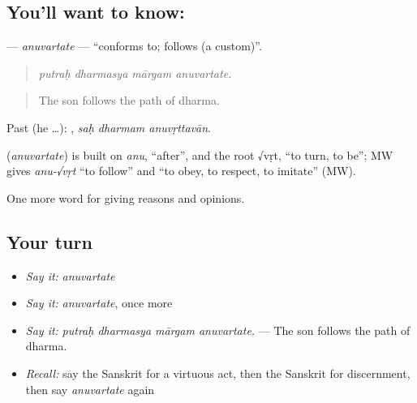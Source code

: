 \subsection*{You'll want to know: }
\textbf{} — \emph{anuvartate} — \textquotedblleft{}conforms to; follows (a custom)\textquotedblright{}.

\begin{quote}
   
\end{quote}

\begin{quote}
\emph{putraḥ dharmasya mārgam anuvartate.}
\end{quote}

\begin{quote}
The son follows the path of dharma.
\end{quote}

Past (he …):   , \emph{saḥ dharmam anuvṛttavān}.

\begin{cousinweb}
\textbf{} (\emph{anuvartate}) is built on \emph{anu}, \textquotedblleft{}after\textquotedblright{}, and the root √vṛt, \textquotedblleft{}to turn, to be\textquotedblright{}; MW gives \emph{anu-√vṛt} \textquotedblleft{}to follow\textquotedblright{} and \textquotedblleft{}to obey, to respect, to imitate\textquotedblright{} (MW).
\end{cousinweb}

\begin{grammarlens}[title={What you've built}]
One more word for giving reasons and opinions.
\end{grammarlens}

\subsection*{Your turn}
\begin{itemize}
\raggedright
  \item \emph{Say it:} \emph{anuvartate}
  \item \emph{Say it:} \emph{anuvartate}, once more
  \item \emph{Say it:} \emph{putraḥ dharmasya mārgam anuvartate.} — The son follows the path of dharma.
  \item \emph{Recall:} say the Sanskrit for a virtuous act, then the Sanskrit for discernment, then say \emph{anuvartate} again
\end{itemize}

